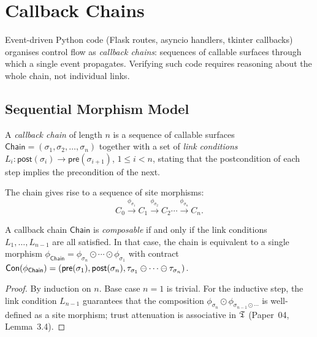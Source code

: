 \documentclass[11pt]{article}
\newcommand{\surf}{\sigma}                     %
\newcommand{\Chain}{\mathsf{Chain}}            %
\newcommand{\Contract}{\mathsf{Con}}           %
\newcommand{\Pre}{\mathsf{pre}}                %
\newcommand{\Post}{\mathsf{post}}              %
\newcommand{\compose}{\mathbin{\odot}}         %
\begin{document}
\section{Callback Chains}\label{sec:callbacks}

Event-driven Python code (Flask routes, asyncio handlers, tkinter
callbacks) organises control flow as \emph{callback chains}: sequences
of callable surfaces through which a single event propagates.  Verifying
such code requires reasoning about the whole chain, not individual links.

\subsection{Sequential Morphism Model}

\begin{definition}\label{def:cbchain}
A \emph{callback chain} of length $n$ is a sequence of callable
surfaces $\Chain = (\surf_1, \surf_2, \dots, \surf_n)$ together with
a set of \emph{link conditions}
$L_i : \Post(\surf_i) \to \Pre(\surf_{i+1})$, $1 \le i < n$, stating
that the postcondition of each step implies the precondition of the
next.
\end{definition}

The chain gives rise to a sequence of site morphisms:
\[
  C_0 \xrightarrow{\phi_{\surf_1}} C_1
      \xrightarrow{\phi_{\surf_2}} C_2
      \cdots
      \xrightarrow{\phi_{\surf_n}} C_n.
\]

\begin{proposition}\label{prop:chaincomp}
A callback chain $\Chain$ is \emph{composable} if and only if the
link conditions $L_1, \dots, L_{n-1}$ are all satisfied.  In that
case, the chain is equivalent to a single morphism
$\phi_\Chain = \phi_{\surf_n} \compose \cdots \compose \phi_{\surf_1}$
with contract
$\Contract(\phi_\Chain) = (\Pre(\surf_1), \Post(\surf_n),
\tau_{\surf_1} \tatten \cdots \tatten \tau_{\surf_n})$.
\end{proposition}

\begin{proof}
By induction on $n$.  Base case $n=1$ is trivial.  For the inductive
step, the link condition $L_{n-1}$ guarantees that the composition
$\phi_{\surf_n} \compose \phi_{\surf_{n-1} \compose \cdots}$ is
well-defined as a site morphism; trust attenuation is associative in
$\mathfrak{T}$ (Paper~04, Lemma~3.4).
\end{proof}
\end{document}
